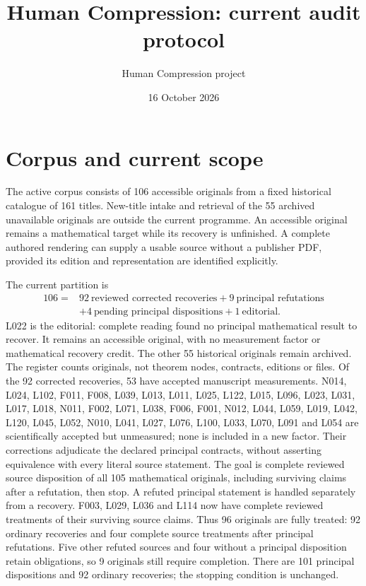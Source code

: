 \documentclass[11pt,a4paper]{article}
\title{Human Compression: current audit protocol}
\author{Human Compression project}
\date{16 October 2026}
\begin{document}
\maketitle

\section{Corpus and current scope}

The active corpus consists of 106 accessible originals from a fixed historical
catalogue of 161 titles. New-title intake and retrieval of the 55 archived
unavailable originals are outside the current programme. An accessible original
remains a mathematical target while its recovery is unfinished. A complete
authored rendering can supply a usable source without a publisher PDF, provided
its edition and representation are identified explicitly.

The current partition is
\[
\begin{aligned}
106={}&92\ \text{reviewed corrected recoveries}+9\ \text{principal refutations}\\
      &+4\ \text{pending principal dispositions}+1\ \text{editorial}.
\end{aligned}
\]
L022 is the editorial: complete reading found no principal mathematical result
to recover. It remains an accessible original, with no measurement factor or
mathematical recovery credit. The other 55 historical originals remain archived.
The register counts originals, not theorem nodes, contracts, editions or files.
Of the 92 corrected recoveries, 53 have accepted manuscript measurements.
N014, L024, L102, F011, F008, L039, L013, L011, L025, L122, L015, L096, L023, L031, L017, L018, N011, F002, L071, L038, F006, F001, N012, L044, L059, L019, L042, L120, L045, L052, N010, L041, L027, L076, L100, L033, L070, L091 and L054 are scientifically accepted but unmeasured; none is included
in a new factor. Their corrections adjudicate the declared principal contracts,
without asserting equivalence with every literal source statement. The goal
is complete reviewed source disposition of all 105 mathematical originals,
including surviving claims after a refutation, then stop. A refuted principal
statement is handled separately from a recovery. F003, L029, L036 and L114 now
have complete reviewed treatments of their surviving source claims. Thus 96
originals are fully treated: 92 ordinary recoveries and four complete source
treatments after principal refutations. Five other refuted sources and
four without a principal disposition retain obligations, so 9 originals
still require completion. There are 101 principal dispositions and 92
ordinary recoveries; the stopping condition is unchanged.
\end{document}
